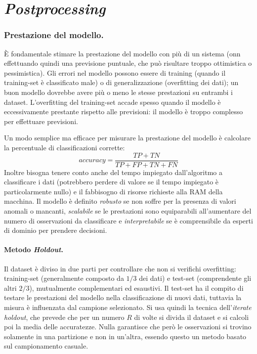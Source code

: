 \documentclass[11pt, a4page, twocolumn]{article}
\begin{document}
\newpage
\part{\textit{Postprocessing}}

\section{Prestazione del modello.}
È fondamentale stimare la prestazione del modello con più di un sistema (onn effettuando quindi una previsione puntuale, che può risultare troppo ottimistica o pessimistica).
Gli errori nel modello possono essere di training (quando il training-set è classificato male) o di generalizzazione (overfitting dei dati); un buon modello dovrebbe avere più o meno le stesse prestazioni su entrambi i dataset.
L'overfitting del training-set accade spesso quando il modello è eccessivamente prestante rispetto alle previsioni: il modello è troppo complesso per effettuare previsioni.

Un modo semplice ma efficace per misurare la prestazione del modello è calcolare la percentuale di classificazioni corrette:
\begin{equation*}
  accuracy = \frac{TP + TN}{TP + FP + TN + FN}
\end{equation*}
Inoltre bisogna tenere conto anche del tempo impiegato dall'algoritmo a classificare i dati (potrebbero perdere di valore se il tempo impiegato è particolarmente nullo) e il fabbisogno di risorse richieste alla RAM della macchina.
Il modello è definito \textit{robusto} se non soffre per la presenza di valori anomali o mancanti, \textit{scalabile} se le prestazioni sono equiparabili all'aumentare del numero di osservazioni da classificare e \textit{interpretabile} se è comprensibile da esperti di dominio per prendere decisioni. \newline

\subsection{Metodo \textit{Holdout}.}
Il dataset è diviso in due parti per controllare che non si verifichi overfitting: training-set (generalmente composto da $1/3$ dei dati) e test-set (comprendente gli altri $2/3$), mutualmente complementari ed esaustivi.
Il test-set ha il compito di testare le prestazioni del modello nella classificazione di nuovi dati, tuttavia la misura è influenzata dal campione selezionato.
Si usa quindi la tecnica dell'\textit{iterate holdout}, che prevede che per un numero $R$ di volte si divida il dataset e si calcoli poi la media delle accuratezze.
Nulla garantisce che però le osservazioni si trovino solamente in una partizione e non in un'altra, essendo questo un metodo basato sul campionamento casuale.
\end{document}
